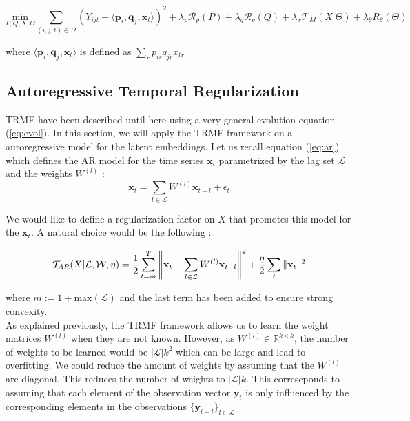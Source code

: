 \documentclass{article}
\begin{document}
\begin{equation}
\underset{P,Q,X,\Theta}{\text{min}} \sum_{(i,j,t) \in \Omega} (Y_{ijt} - \langle \mathbf{p}_i,\mathbf{q}_j,\mathbf{x}_t \rangle )^2 + \lambda_p \mathcal{R}_p(P) + \lambda_q \mathcal{R}_q(Q) + \lambda_x \mathcal{T}_M(X | \Theta) + \lambda_{\theta} R_{\theta}(\Theta)
\label{eq:model_tensor}
\end{equation}

where $\langle \mathbf{p}_i,\mathbf{q}_j,\mathbf{x}_t \rangle$ is defined as $\sum_r p_{ir}q_{jr}x_{tr}$

\subsection*{Autoregressive Temporal Regularization}
TRMF have been described until here using a very general evolution equation (\ref{eq:evol}). In this section, we will apply the TRMF framework on a auroregressive model for the latent embeddings. Let us recall equation (\ref{eq:ar}) which defines the AR model for the time series $\mathbf{x}_t$ parametrized by the lag set $\mathcal{L}$ and the weights $W^{(l)}$ :
$$\mathbf{x}_t = \sum_{l \in \mathcal{L}} W^{(l)} \mathbf{x}_{t-l} + \epsilon_t$$

We would like to define a regularization factor on $X$ that promotes this model for the $\mathbf{x}_t$. A natural choice would be the following :

$$\mathcal{T}_{AR}(X|\mathcal{L}, \mathcal{W}, \eta) = \frac{1}{2} \sum_{t=m}^T \left\lVert\mathbf{x}_t - \sum_{l \in \mathcal{L}} W^{(l)} \mathbf{x}_{t-l}\right\rVert^2 + \frac{\eta}{2} \sum_t \|\mathbf{x}_t\|^2$$

where $m := 1+\text{max}(\mathcal{L})$ and the last term has been added to ensure strong convexity. \\
As explained previously, the TRMF framework allows us to learn the weight matrices $W^{(l)}$ when they are not known. However, as $W^{(l)} \in \mathbb{R}^{k \times k}$, the number of weights to be learned would be $|\mathcal{L}|k^2$ which can be large and lead to overfitting. We could reduce the amount of weights by assuming that the $W^{(l)}$ are diagonal. This reduces the number of weights to $|\mathcal{L}|k$.
This correseponds to assuming that each element of the observation vector $\mathbf{y}_t$ is only influenced by the corresponding elements in the observations $\{\mathbf{y}_{t-l}\}_{l \in \mathcal{L}}$





\end{document}
